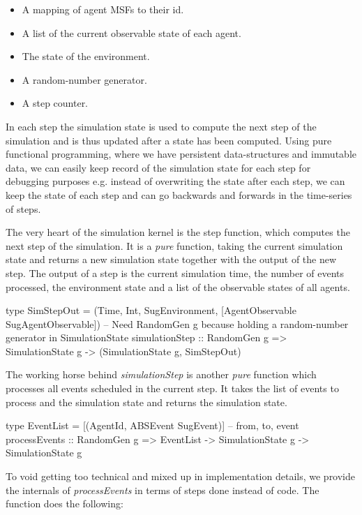 \begin{itemize}
	\item A mapping of agent MSFs to their id.
	\item A list of the current observable state of each agent.
	\item The state of the environment.
	\item A random-number generator.
	\item A step counter.
\end{itemize}

In each step the simulation state is used to compute the next step of the simulation and is thus updated after a state has been computed. Using pure functional programming, where we have persistent data-structures and immutable data, we can easily keep record of the simulation state for each step for debugging purposes e.g. instead of overwriting the state after each step, we can keep the state of each step and can go backwards and forwards in the time-series of steps.

The very heart of the simulation kernel is the step function, which computes the next step of the simulation. It is a \textit{pure} function, taking the current simulation state and returns a new simulation state together with the output of the new step. The output of a step is the current simulation time, the number of events processed, the environment state and a list of the observable states of all agents.

\begin{HaskellCode}
type SimStepOut = (Time, Int, SugEnvironment, [AgentObservable SugAgentObservable])
-- Need RandomGen g because holding a random-number generator in SimulationState
simulationStep :: RandomGen g => SimulationState g -> (SimulationState g, SimStepOut)
\end{HaskellCode}

The working horse behind \textit{simulationStep} is another \textit{pure} function which processes all events scheduled in the current step. It takes the list of events to process and the simulation state and returns the simulation state.

\begin{HaskellCode}
type EventList  = [(AgentId, ABSEvent SugEvent)]  -- from, to, event
processEvents :: RandomGen g => EventList -> SimulationState g -> SimulationState g
\end{HaskellCode}

To void getting too technical and mixed up in implementation details, we provide the internals of \textit{processEvents} in terms of steps done instead of code. The function does the following:

